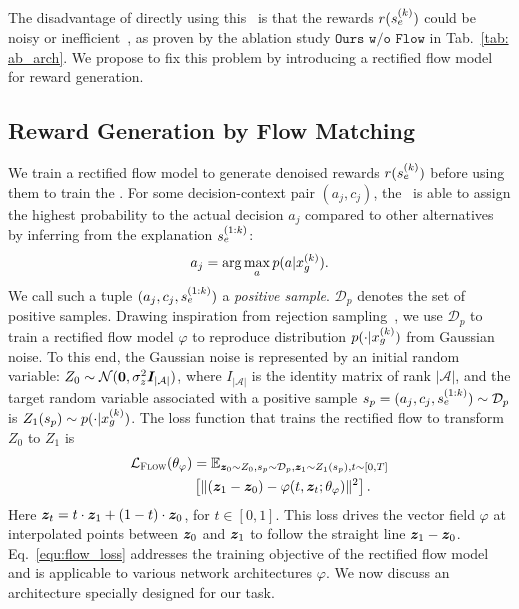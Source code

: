 The disadvantage of directly using this \rlm~is that the rewards $r(\idx[s][e][k])$ could be noisy or inefficient~\cite{yang2024regularizing}, as proven by the ablation study $\mathtt{Ours}$ $\mathtt{w/o}$ $\mathtt{Flow}$ in Tab.~\ref{tab: ab_arch}. We propose to fix this problem by introducing a rectified flow model for reward generation.

\subsection{Reward Generation by Flow Matching}

We train a rectified flow model to generate denoised rewards $r(\idx[s][e][k])$ before using them to train the \elm. For some decision-context pair $(a_j, c_j)$, the \rlm~is able to assign the highest probability to the actual decision $a_j$ compared to other alternatives by inferring from the explanation $\idx[s][e][1:k]$:
\begin{align}
    a_j = \arg\max_a  p(a | \idx[x][g][k]) .
\end{align}
We call such a tuple $(a_j, c_j, \idx[s][e][1:k])$ a \emph{positive sample}. $\mathcal{D}_p$ denotes the set of positive samples. Drawing inspiration from rejection sampling~\cite{touvron2023llama}, we use $\mathcal{D}_p$ to train a rectified flow model $\varphi$ to reproduce distribution $p(\cdot | \idx[x][g][k])$ from Gaussian noise. To this end, the Gaussian noise is represented by an initial random variable: $Z_0\sim \mathcal{N}(\bm 0, \sigma_z^2 {\bm{I}}_{|\mathcal{A}|})$, where $I_{|\mathcal{A}|}$ is the identity matrix of rank $|\mathcal{A}|$, and the target random variable associated with a positive sample $s_p=(a_j, c_j, \idx[s][e][1:k])\sim\mathcal{D}_p$ is $Z_1(s_p)\sim p(\cdot | \idx[x][g][k])$.
The loss function that trains the rectified flow to transform $Z_0$ to $Z_1$ is
\begin{align}
    \mathcal{L}_{\textsc{Flow}}(\theta_\varphi) &= \mathbb{E}_{{\bm{z}}_0\sim Z_0, s_p\sim \mathcal{D}_p,{\bm{z}}_1\sim Z_1(s_p), t\sim [0,T]} \nonumber\\
    &\left[\|({\bm{z}}_1-{\bm{z}}_0)-\varphi(t,{\bm{z}}_t; \theta_\varphi)\|^2\right].\label{equ:flow_loss}
\end{align}
Here ${\bm{z}}_t = t\cdot {\bm{z}}_1 + (1-t)\cdot {\bm{z}}_0$, for $t\in[0,1]$. This loss drives the vector field $\varphi$ at interpolated points between ${\bm{z}}_0$ and ${\bm{z}}_1$ to follow the straight line ${\bm{z}}_1-{\bm{z}}_0$. Eq.~\ref{equ:flow_loss} addresses the training objective of the rectified flow model and is applicable to various network architectures $\varphi$. We now discuss an architecture specially designed for our task.

